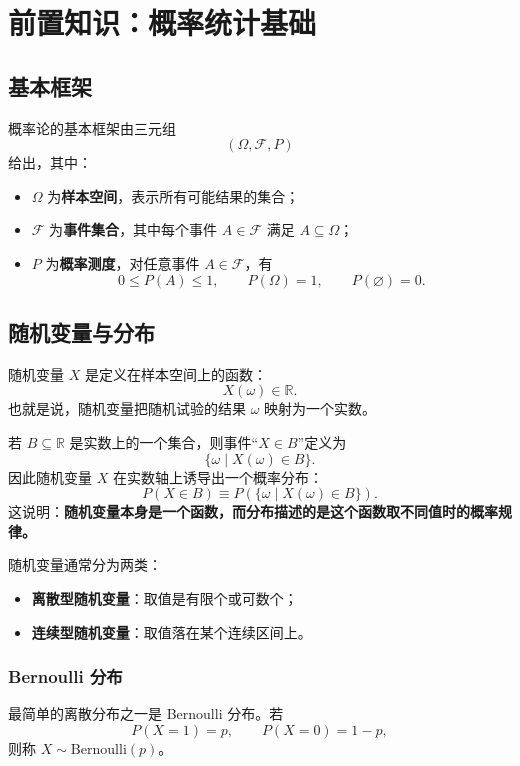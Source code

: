 \newpage
\section{前置知识：概率统计基础}

\subsection{基本框架}
概率论的基本框架由三元组
\[
(\Omega,\mathcal{F},P)
\]
给出，其中：
\begin{itemize}
    \item \(\Omega\) 为\textbf{样本空间}，表示所有可能结果的集合；
    \item \(\mathcal{F}\) 为\textbf{事件集合}，其中每个事件 \(A\in\mathcal{F}\) 满足 \(A\subseteq \Omega\)；
    \item \(P\) 为\textbf{概率测度}，对任意事件 \(A\in\mathcal{F}\)，有
    \[
    0\le P(A)\le 1,\qquad P(\Omega)=1,\qquad P(\varnothing)=0.
    \]
\end{itemize}

\subsection{随机变量与分布}

随机变量 \(X\) 是定义在样本空间上的函数：
\[
X(\omega)\in \mathbb{R}.
\]
也就是说，随机变量把随机试验的结果 \(\omega\) 映射为一个实数。

若 \(B\subseteq \mathbb{R}\) 是实数上的一个集合，则事件``\(X\in B\)''定义为
\[
\{\omega\mid X(\omega)\in B\}.
\]
因此随机变量 \(X\) 在实数轴上诱导出一个概率分布：
\[
P(X\in B)\equiv P\left(\{\omega\mid X(\omega)\in B\}\right).
\]
这说明：\textbf{随机变量本身是一个函数，而分布描述的是这个函数取不同值时的概率规律。}

随机变量通常分为两类：

\begin{itemize}
    \item \textbf{离散型随机变量}：取值是有限个或可数个；
    \item \textbf{连续型随机变量}：取值落在某个连续区间上。
\end{itemize}

\subsubsection{Bernoulli 分布}

最简单的离散分布之一是 Bernoulli 分布。若
\[
P(X=1)=p,\qquad P(X=0)=1-p,
\]
则称 \(X\sim \mathrm{Bernoulli}(p)\)。

